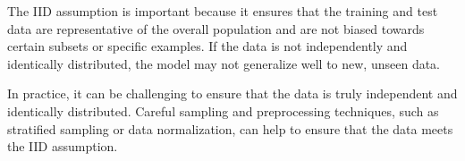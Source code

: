 \documentclass{article}
\begin{document}
The IID assumption is important because it ensures that the training and test data are representative of the overall population and are not biased towards certain subsets or specific examples. If the data is not independently and identically distributed, the model may not generalize well to new, unseen data.

In practice, it can be challenging to ensure that the data is truly independent and identically distributed. Careful sampling and preprocessing techniques, such as stratified sampling or data normalization, can help to ensure that the data meets the IID assumption.
\end{document}
